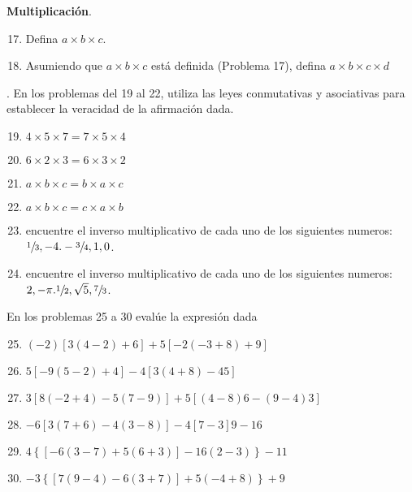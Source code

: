 \documentclass[10pt,a4paper]{article}
\begin{document}
{\bfseries Multiplicación}.
\begin{enumerate}[label=\textbf{\arabic*.}]
 \setcounter{enumi}{16}
    \item Defina ${a\times b\times c}$.
    \item Asumiendo que ${a\times b\times c}$ está definida (Problema 17), defina ${a\times b\times c \times d}$
\end{enumerate}.
En los problemas del 19 al 22, utiliza las leyes conmutativas y asociativas para establecer la veracidad de la afirmación dada.
\begin{multicols}{2}
\begin{enumerate}[label=\textbf{\arabic*.}]
\setcounter{enumi}{18}
	\item ${4\times 5\times 7 = 7 \times 5 \times 4}$
	\item ${6\times 2\times 3 = 6 \times 3 \times 2}$
	\item ${a\times b\times c = b \times a \times c }$
	\item ${a\times b\times c = c \times a \times b}$
\end{enumerate}
\end{multicols}
\begin{enumerate}[label=\textbf{\arabic*.}]
\setcounter{enumi}{22}
\item encuentre el inverso multiplicativo de cada uno de los siguientes numeros: ${\sfrac{1}{3},-4.-\sfrac{3}{4},1,0}$.
\item encuentre el inverso multiplicativo de cada uno de los siguientes numeros: ${2,-\pi.\sfrac{1}{2},\sqrt{5},\sfrac{7}{3}}$.
\end{enumerate}
En los problemas 25 a 30 evalúe la expresión dada
\begin{enumerate}[label=\textbf{\arabic*.}]
\setcounter{enumi}{24}
	\item ${(-2)[3(4-2)+6]+5[-2(-3+8)+9]}$
	\item ${5[-9(5-2)+4]-4[3(4+8)-45]}$
	\item ${3[8(-2+4)-5(7-9)]+5[(4-8)6-(9-4)3]}$
	\item ${-6[3(7+6)-4(3-8)]-4[7-3]9-16}$
	\item ${4\left\lbrace[-6(3-7)+5(6+3)]-16(2-3) \right\rbrace-11}$
	\item ${-3\left\lbrace[7(9-4)-6(3+7)]+5(-4+8) \right\rbrace+9}$
		
\end{enumerate}
\newpage
\end{document}
